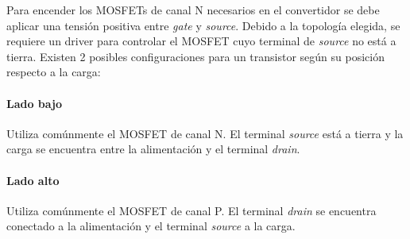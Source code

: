 Para encender los MOSFETs de canal N necesarios en el convertidor se debe aplicar una tensión positiva entre \textit{gate} y \textit{source}. 
Debido a la topología elegida, se requiere un driver para controlar el MOSFET cuyo terminal de \textit{source} no está a tierra.
Existen 2 posibles configuraciones para un transistor según su posición respecto a la carga:

\paragraph{Lado bajo} Utiliza comúnmente el MOSFET de canal N. 
El terminal \textit{source} está a tierra y la carga se encuentra entre la alimentación y el terminal \textit{drain}. 

\paragraph{Lado alto} Utiliza comúnmente el MOSFET de canal P. 
El terminal \textit{drain} se encuentra conectado a la alimentación y el terminal \textit{source} a la carga.\\

